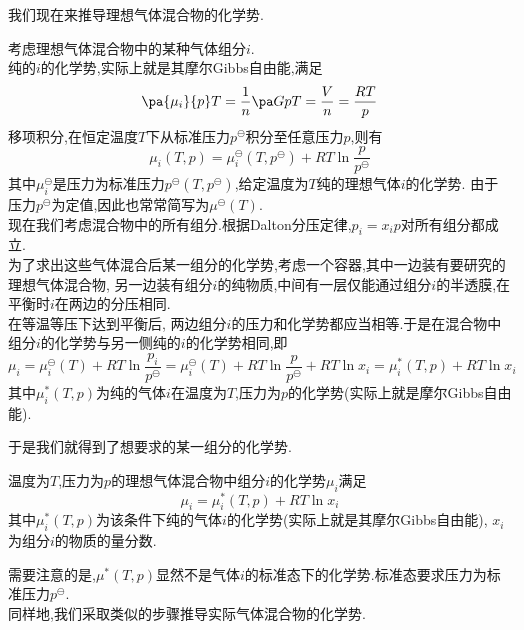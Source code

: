 \documentclass{ctexart}
\begin{document}
\indent 我们现在来推导理想气体混合物的化学势.
\begin{derivation}
    考虑理想气体混合物中的某种气体组分$i$.\\
    纯的$i$的化学势,实际上就是其摩尔Gibbs自由能,满足
    \begin{equation}
        \pa{\mu_i}{p}T=\dfrac{1}{n}\pa GpT=\dfrac{V}{n}=\dfrac{RT}{p}
    \end{equation}
    移项积分,在恒定温度$T$下从标准压力$p^\ominus$积分至任意压力$p$,则有
    \[\mu_i(T,p)=\mu_i^\ominus\left(T,p^\ominus\right)+RT\ln\dfrac{p}{p^\ominus}\]
    其中$\mu_i^\ominus$是压力为标准压力$p^\ominus\left(T,p^\ominus\right)$,给定温度为$T$纯的理想气体$i$的化学势.%
    由于压力$p^\ominus$为定值,因此也常常简写为$\mu^\ominus(T)$.\\
    现在我们考虑混合物中的所有组分.根据Dalton分压定律,$p_i=x_ip$对所有组分都成立.\\
    为了求出这些气体混合后某一组分的化学势,考虑一个容器,其中一边装有要研究的理想气体混合物,%
    另一边装有组分$i$的纯物质,中间有一层仅能通过组分$i$的半透膜,在平衡时$i$在两边的分压相同\footnotemark.\\
    在等温等压下达到平衡后,%
    两边组分$i$的压力和化学势都应当相等.于是在混合物中组分$i$的化学势与另一侧纯的$i$的化学势相同,即
    \begin{equation}
        \mu_i=\mu_i^\ominus(T)+RT\ln\dfrac{p_i}{p^\ominus}
        =\mu_i^\ominus(T)+RT\ln\dfrac{p}{p^\ominus}+RT\ln x_i
        =\mu_i^\ast(T,p)+RT\ln x_i
    \end{equation}
    其中$\mu_i^\ast(T,p)$为纯的气体$i$在温度为$T$,压力为$p$的化学势(实际上就是摩尔Gibbs自由能).
\end{derivation}
于是我们就得到了想要求的某一组分的化学势.
\begin{theorem}[4B.4.1 理想气体混合物中各组分的化学势]
    温度为$T$,压力为$p$的理想气体混合物中组分$i$的化学势$\mu_i$满足
    \[\mu_i=\mu_i^{\ast}(T,p)+RT\ln x_i\]
    其中$\mu_i^{\ast}(T,p)$为该条件下纯的气体$i$的化学势(实际上就是其摩尔Gibbs自由能),%
    $x_i$为组分$i$的物质的量分数.
\end{theorem}
需要注意的是,$\mu^{\ast}(T,p)$显然不是气体$i$的标准态下的化学势.标准态要求压力为标准压力$p^\ominus$.\vspace{4pt}\\
\indent 同样地,我们采取类似的步骤推导实际气体混合物的化学势.
\end{document}
